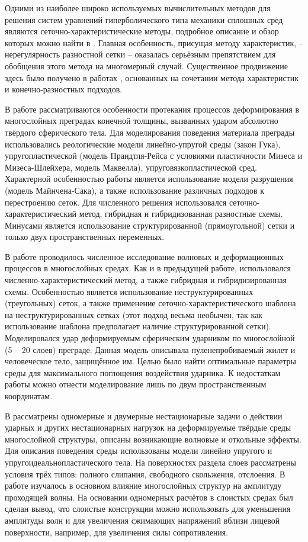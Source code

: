 Одними из наиболее широко используемых вычислительных методов для решения систем уравнений гиперболического типа механики сплошных сред являются сеточно-характеристические методы, подробное описание и обзор которых можно найти в \cite{magomedov}. Главная особенность, присущая методу характеристик, -- нерегулярность разностной сетки -- оказалась серьёзным препятствием для обобщения этого метода на многомерный случай. Существенное продвижение здесь было получено в работах \cite{chushkin}, основанных на сочетании метода характеристик и конечно-разностных подходов.

В работе \cite{petrov_chelnokov} рассматриваются особенности протекания процессов деформирования в многослойных преградах конечной толщины, вызванных ударом абсолютно твёрдого сферического тела. Для моделирования поведения материала преграды использовались реологические модели линейно-упругой среды (закон Гука), упругопластической (модель Прандтля-Рейса с условиями пластичности Мизеса и Мизеса-Шлейхера, модель Маквелла), упруговязкопластической сред. Характерной особенностью работы является использование модели разрушения (модель Майнчена-Сака), а также использование различных подходов к перестроению сеток. Для численного решения использовался сеточно-характеристический метод, гибридная и гибридизованная разностные схемы. Минусами является использование структурированной (прямоугольной) сетки и только двух пространственных переменных.

В работе \cite{matyushev_petrov} проводилось численное исследование волновых и деформационных процессов в многослойных  средах. Как и в предыдущей работе, использовался численно-характеристический метод, а также гибридная и гибридизированная схемы. Особенностью является использование неструктурированных (треугольных) сеток, а также применение сеточно-характеристического шаблона на неструктурированных сетках (этот подход весьма необычен, так как использование шаблона предполагает наличие структурированной сетки). Моделировался удар деформируемым сферическим ударником по многослойной (5 – 20 слоев) преграде. Данная модель описывала пуленепробиваемый жилет и человеческое тело, защищённое им. Целью было найти оптимальные параметры среды для максимального поглощения воздействия ударника. К недостаткам работы можно отнести моделирование лишь по двум пространственным координатам.

В \cite{petrov_tormasov_holodov} рассматрены одномерные и двумерные нестационарные задачи о действии ударных и других нестационарных нагрузок на деформируемые твёрдые среды многослойной структуры, описаны возникающие волновые и откольные эффекты. Для описания поведения среды использованы модели линейно упругого и упругоидеальнопластического тела. На поверхностях раздела слоев рассматрены условия трёх типов: полного слипания, свободного скольжения, отслоения. В работе изучалось в основном влияние многослойных структур на амплитуду проходящей волны. На основании одномерных расчётов в слоистых средах был сделан вывод, что слоистые конструкции можно использовать для уменьшения амплитуды волн и для увеличения сжимающих напряжений вблизи лицевой поверхности, например, для увеличения силы сопротивления.

